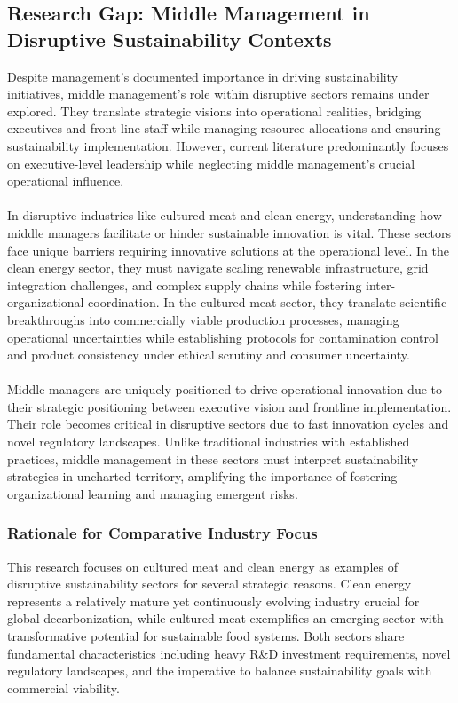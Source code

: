 	\subsection{Research Gap: Middle Management in Disruptive Sustainability Contexts}
	Despite management's documented importance in driving sustainability initiatives, middle management's role within disruptive sectors remains under explored. They translate strategic visions into operational realities, bridging executives and front line staff while managing resource allocations and ensuring sustainability implementation. However, current literature predominantly focuses on executive-level leadership while neglecting middle management’s crucial operational influence.
	
	\paragraph*{} In disruptive industries like cultured meat and clean energy, understanding how middle managers facilitate or hinder sustainable innovation is vital. These sectors face unique barriers requiring innovative solutions at the operational level. In the clean energy sector, they must navigate scaling renewable infrastructure, grid integration challenges, and complex supply chains while fostering inter-organizational coordination. In the cultured meat sector, they translate scientific breakthroughs into commercially viable production processes, managing operational uncertainties while establishing protocols for contamination control and product consistency under ethical scrutiny and consumer uncertainty.
	
	\paragraph*{} Middle managers are uniquely positioned to drive operational innovation due to their strategic positioning between executive vision and frontline implementation. Their role becomes critical in disruptive sectors due to fast innovation cycles and novel regulatory landscapes. Unlike traditional industries with established practices, middle management in these sectors must interpret sustainability strategies in uncharted territory, amplifying the importance of fostering organizational learning and managing emergent risks.
	
	\subsubsection{Rationale for Comparative Industry Focus}
	This research focuses on cultured meat and clean energy as examples of disruptive sustainability sectors for several strategic reasons. Clean energy represents a relatively mature yet continuously evolving industry crucial for global decarbonization, while cultured meat exemplifies an emerging sector with transformative potential for sustainable food systems. Both sectors share fundamental characteristics including heavy R\&D investment requirements, novel regulatory landscapes, and the imperative to balance sustainability goals with commercial viability.
	
